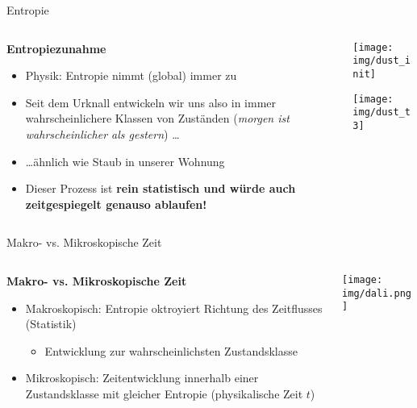 \begin{frame}{Entropie}
    \begin{columns}
        \begin{column}{.7\textwidth}
            \textbf{Entropiezunahme}
            \begin{itemize}
                \item Physik: Entropie nimmt (global) immer zu 
                \item Seit dem Urknall entwickeln wir uns also in immer wahrscheinlichere Klassen von Zuständen (\textit{morgen ist wahrscheinlicher als gestern}) \ldots
                \item \ldots ähnlich wie Staub in unserer Wohnung
                \item<2> Dieser Prozess ist \textbf{rein statistisch und würde auch zeitgespiegelt genauso ablaufen!}
            \end{itemize}
        \end{column}
        \begin{column}{.3\textwidth}
            \centering
            \texttt{[image: img/dust\_init]}

            \vspace{5mm}
            \scalebox{2.}{$\downarrow$}

            \vspace{5mm}
            \texttt{[image: img/dust\_t3]}
        \end{column}
    \end{columns}
\end{frame}

\begin{frame}{Makro- vs. Mikroskopische Zeit}
    \begin{columns}
        \begin{column}{.6\textwidth}
            \textbf{Makro- vs. Mikroskopische Zeit}
            \begin{itemize}
                \item Makroskopisch: Entropie oktroyiert Richtung des Zeitflusses (Statistik)
                \begin{itemize}
                    \item Entwicklung zur wahrscheinlichsten Zustandsklasse
                \end{itemize}
                \item Mikroskopisch: Zeitentwicklung innerhalb einer Zustandsklasse mit gleicher Entropie (physikalische Zeit $t$)
            \end{itemize}
        \end{column}
        \begin{column}{.4\textwidth}
            \centering
            \texttt{[image: img/dali.png]}\\
        \end{column}
    \end{columns}
\end{frame}

